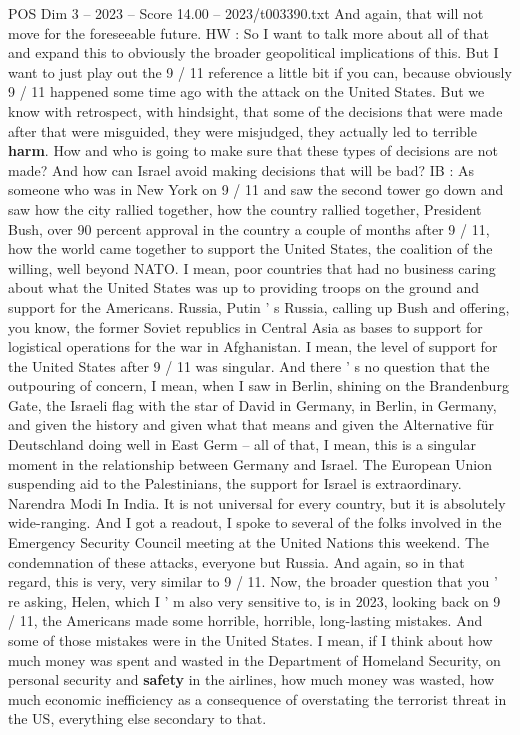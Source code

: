 \begin{textsample}{POS Dim 3 – 2023 – Score 14.00 – 2023/t003390.txt}
And again, that will not move for the foreseeable future.
HW : So I want to talk more about all of that and expand this to obviously the broader geopolitical implications of this.
But I want to just play out the 9 / 11 reference a little bit if you can, because obviously 9 / 11 happened some time ago with the attack on the United States.
But we know with retrospect, with hindsight, that some of the decisions that were made after that were misguided, they were misjudged, they actually led to terrible \textbf{harm}.
How and who is going to make sure that these types of decisions are not made?
And how can Israel avoid making decisions that will be bad?
IB : As someone who was in New York on 9 / 11 and saw the second tower go down and saw how the city rallied together, how the country rallied together, President Bush, over 90 percent approval in the country a couple of months after 9 / 11, how the world came together to support the United States, the coalition of the willing, well beyond NATO.
I mean, poor countries that had no business caring about what the United States was up to providing troops on the ground and support for the Americans.
Russia, Putin ' s Russia, calling up Bush and offering, you know, the former Soviet republics in Central Asia as bases to support for logistical operations for the war in Afghanistan.
I mean, the level of support for the United States after 9 / 11 was singular.
And there ' s no question that the outpouring of concern, I mean, when I saw in Berlin, shining on the Brandenburg Gate, the Israeli flag with the star of David in Germany, in Berlin, in Germany, and given the history and given what that means and given the Alternative für Deutschland doing well in East Germ -- all of that, I mean, this is a singular moment in the relationship between Germany and Israel.
The European Union suspending aid to the Palestinians, the support for Israel is extraordinary.
Narendra Modi In India.
It is not universal for every country, but it is absolutely wide-ranging.
And I got a readout, I spoke to several of the folks involved in the Emergency Security Council meeting at the United Nations this weekend.
The condemnation of these attacks, everyone but Russia.
And again, so in that regard, this is very, very similar to 9 / 11.
Now, the broader question that you ' re asking, Helen, which I ' m also very sensitive to, is in 2023, looking back on 9 / 11, the Americans made some horrible, horrible, long-lasting mistakes.
And some of those mistakes were in the United States.
I mean, if I think about how much money was spent and wasted in the Department of Homeland Security, on personal security and \textbf{safety} in the airlines, how much money was wasted, how much economic inefficiency as a consequence of overstating the terrorist threat in the US, everything else secondary to that.

\end{textsample}
